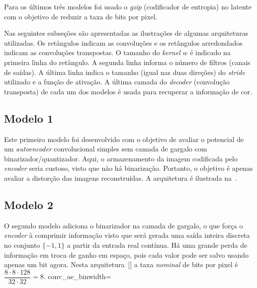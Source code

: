 Para os últimos três modelos foi usado o \textit{gzip} (codificador de entropia) no latente com o objetivo de reduzir a taxa de bits por pixel.

Nas seguintes subseções são apresentadas as ilustrações de algumas arquiteturas utilizadas. Os retângulos indicam as convoluções e os retângulos arredondados indicam as convoluções transpostas. O tamanho do \textit{kernel} $w$ é indicado na primeira linha do retângulo. A segunda linha informa o número de filtros (canais de saídas). A última linha indica o tamanho (igual nas duas direções) do \textit{stride} utilizado e a função de ativação. A última camada do \textit{decoder} (convolução transposta) de cada um dos modelos é usada para recuperar a informação de cor.
\subsection{Modelo 1}
\label{cap3:mod1}
Este primeiro modelo foi desenvolvido com o objetivo de avaliar o potencial de um \textit{autoencoder} convolucional simples sem camada de gargalo com binarizador/quantizador. Aqui, o armazenamento da imagem codificada pelo \textit{encoder} seria custoso, visto que não há binarização. Portanto, o objetivo é apenas avaliar a distorção das imagens reconstruídas. A arquitetura é ilustrada na~.
\subsection{Modelo 2}
\label{cap3:mod2}
O segundo modelo adiciona o binarizador na camada de gargalo, o que força o \textit{encoder} à comprimir informação visto que será gerada uma saída inteira discreta no conjunto $\{-1, 1\}$ a partir da entrada real contínua. Há uma grande perda de informação em troca de ganho em espaço, pois cada valor pode ser salvo usando apenas um bit agora. Nesta arquitetura~[] a taxa \emph{nominal} de bits por pixel é $\dfrac{8\cdot8\cdot128}{32\cdot32} = 8$. 
 {conv_ae_bin}{width=\textwidth}

